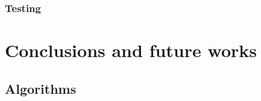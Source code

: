 \documentclass[11pt, a4paper, hidelinks]{report}
\begin{document}
\subsection{Testing}\label{subsec:testing3}

\chapter{Conclusions and future works}\label{ch:conclusions-and-future-works}

\newpage

\appendix

\section*{Algorithms}
\end{document}
